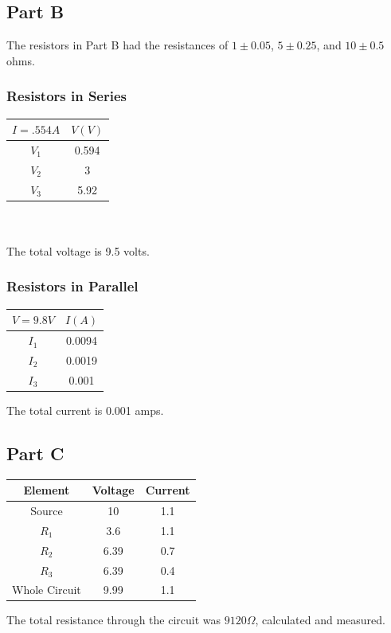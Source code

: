 \documentclass[titlepage]{article}
\begin{document}
\subsection{Part B}\label{sub:part_b-data}

The resistors in Part B had the resistances of $1 \pm 0.05$, $5 \pm 0.25$, and $10 \pm 0.5$ ohms.

\subsubsection{Resistors in Series}\label{ssub:resistors_in_series-data}
\begin{tabular}{cc}
\hline
$I = .554 A$ & $V (V)$\\
\hline
$V_1$ & 0.594\\
\hline
$V_2$ & 3\\
\hline
$V_3$ & 5.92\\
\hline
\end{tabular}
\\
\\
The total voltage is 9.5 volts.

\subsubsection{Resistors in Parallel}\label{ssub:resistors_in_parallel-data}
\begin{tabular}{cc}
\hline
$V = 9.8 V$ & $I (A)$\\
\hline
$I_1$ & 0.0094\\
\hline
$I_2$ & 0.0019\\
\hline
$I_3$ & 0.001\\
\hline
\end{tabular}
The total current is 0.001 amps.

\subsection{Part C}\label{sub:part_c-data}
\begin{tabular}{ccc}
\hline
Element & Voltage & Current\\
\hline
Source & 10 & 1.1\\
\hline
$R_1$ & 3.6 & 1.1\\
\hline
$R_2$ & 6.39 & 0.7\\
\hline
$R_3$ & 6.39 & 0.4\\
\hline
Whole Circuit & 9.99 & 1.1\\
\hline
\end{tabular}
The total resistance through the circuit was $9120 \Omega$, calculated and measured.
\end{document}
